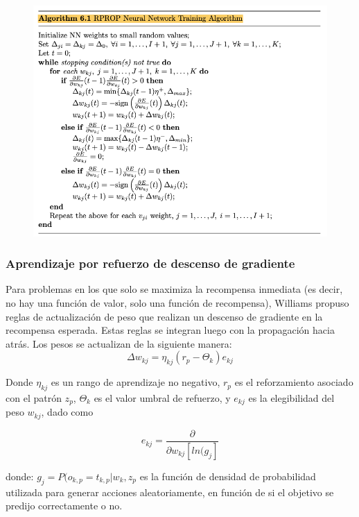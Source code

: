 \documentclass[
	11pt, %
]{beamer}
\begin{document}
\begin{frame}
  
  \begin{figure}
    \includegraphics[width=0.98\linewidth]{rprop.png}
  \end{figure}
  
\end{frame}

\begin{frame}
  \frametitle{Aprendizaje por refuerzo de descenso de gradiente}

  Para problemas en los que solo se maximiza la recompensa inmediata (es decir, no hay una función de valor, solo una función de recompensa), Williams propuso reglas de actualización de peso que realizan un descenso de gradiente en la recompensa esperada. Estas reglas se integran luego con la propagación hacia atrás. Los pesos se actualizan de la siguiente manera:\\

  \[\Delta w_{kj} = \eta_{kj} (r_{p} - \Theta_{k})e_{kj}\]
\end{frame}

\begin{frame}
  
  Donde $\eta_{kj}$ es un rango de aprendizaje no negativo, $r_{p}$ es el reforzamiento asociado con el patrón $z_{p}$, $\Theta_{k}$ es el valor umbral de refuerzo, y $e_{kj}$ es la elegibilidad del peso $w_{kj}$, dado como

  \[ e_{kj} = \frac{\partial}{\partial w_{kj} [ln(g_{j}]}\]

  donde: $g_{j}=P(o_{k,p} = t_{k,p} | w_{k},z_{p}$ es la función de densidad de probabilidad utilizada para generar acciones aleatoriamente, en función de si el objetivo se predijo correctamente o no.
\end{frame}
\end{document}
